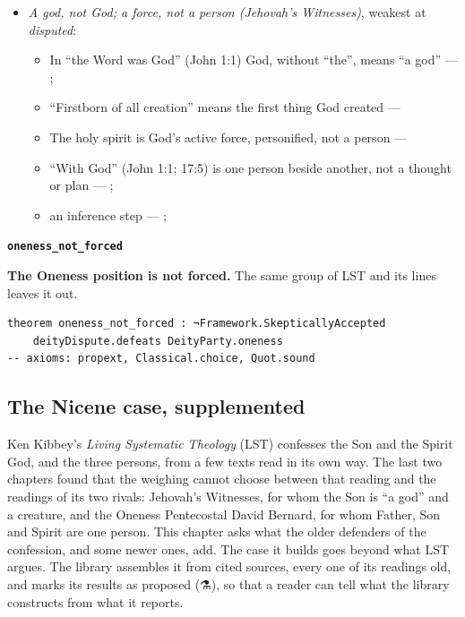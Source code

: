 \documentclass[11pt,paper=\testimonypaper,DIV=13,parskip=false]{scrartcl}
\begin{document}
\begin{itemize}
\begin{itemize}
\item The Spirit who speaks and is grieved is a person, not a force --- \cite[3, The Triune God]{kibbey-living-systematic-theology-2026}
\item In Matthew 28:19 three are named, and the one name is theirs together --- \cite[3, The Triune God]{kibbey-living-systematic-theology-2026}
\end{itemize}
\item \emph{A god, not God; a force, not a person (Jehovah’s Witnesses)}, weakest at \emph{disputed}:
\begin{itemize}
\item In “the Word was God” (John 1:1) God, without “the”, means “a god” --- \cite[27]{watchtower-should-you-believe-trinity-1989}; \cite{new-world-translation-2013}
\item “Firstborn of all creation” means the first thing God created --- \cite[14]{watchtower-should-you-believe-trinity-1989}
\item The holy spirit is God’s active force, personified, not a person --- \cite[20--23]{watchtower-should-you-believe-trinity-1989}
\item “With God” (John 1:1; 17:5) is one person beside another, not a thought or plan --- \cite[3, The Triune God]{kibbey-living-systematic-theology-2026}; \cite[27]{watchtower-should-you-believe-trinity-1989}
\item an inference step --- \cite[23]{watchtower-should-you-believe-trinity-1989}; \cite[122--123]{roberts-christendom-astray}
\end{itemize}
\end{itemize}
\par\medskip\noindent\textbf{\texttt{oneness\_\allowbreak{}not\_\allowbreak{}forced}}\par\nobreak\noindent
\textbf{The Oneness position is not forced.} The same group of LST and its lines leaves it out.

{\small\begin{verbatim}
theorem oneness_not_forced : ¬Framework.SkepticallyAccepted
    deityDispute.defeats DeityParty.oneness
-- axioms: propext, Classical.choice, Quot.sound
\end{verbatim}}
\subsection*{The Nicene case, supplemented}
Ken Kibbey’s \emph{Living Systematic Theology} (LST) confesses the Son and the Spirit God, and the three persons, from a few texts read in its own way. The last two chapters found that the weighing cannot choose between that reading and the readings of its two rivals: Jehovah’s Witnesses, for whom the Son is “a god” and a creature, and the Oneness Pentecostal David Bernard, for whom Father, Son and Spirit are one person. This chapter asks what the older defenders of the confession, and some newer ones, add. The case it builds goes beyond what LST argues. The library assembles it from cited sources, every one of its readings old, and marks its results as proposed (⚗), so that a reader can tell what the library constructs from what it reports.
\end{document}
